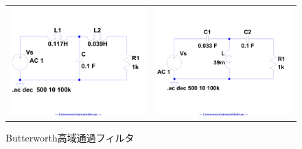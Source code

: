 \documentclass[10pt,a4j,dvipdfmx]{jsarticle}
\begin{document}
\begin{figure}[H]
    \begin{tabular}{cc}
      \begin{minipage}[t]{0.45\hsize}
        \centering
        \includegraphics[width=6cm, angle=270]{But.pdf}
        \caption{Butterworth低域通過フィルタ}
      \end{minipage} &
      \begin{minipage}[t]{0.45\hsize}
        \centering
        \includegraphics[width = 6cm, angle=270]{ButHi.pdf}
        \caption{Butterworth高域通過フィルタ}
      \end{minipage}
    \end{tabular}
  \end{figure}
  
\end{document}

